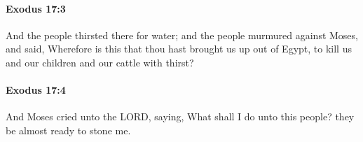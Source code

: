 		\paragraph{Exodus 17:3} %
			\label{EXODUS-17-3}

			And the people thirsted there for water; and the people murmured against Moses, and said, Wherefore is this that thou hast brought us up out of Egypt, to kill us and our children and our cattle with thirst?


		\paragraph{Exodus 17:4} %
			\label{EXODUS-17-4}

			And Moses cried unto the LORD, saying, What shall I do unto this people? they be almost ready to stone me.


